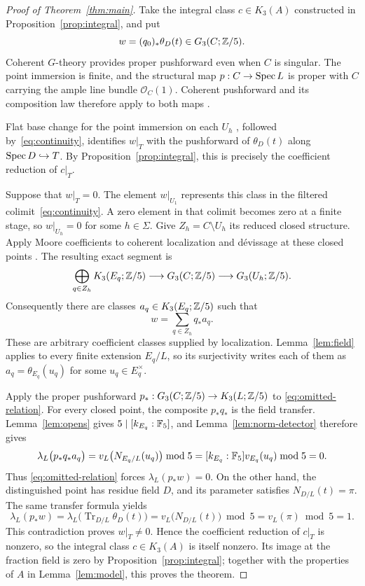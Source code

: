\begin{proof}[Proof of Theorem~\ref{thm:main}]
Take the integral class $c\in K_3(A)$ constructed in
Proposition~\ref{prop:integral}, and put
\[
 w=(q_0)_*\theta_D(t)\in G_3(C;\mathbb Z/5).
\]
Coherent $G$-theory provides proper pushforward even when $C$ is singular.
The point immersion is finite, and the structural map
$p:C\to\operatorname{Spec} L$ is proper with $C$ carrying the ample line bundle
$\mathcal O_C(1)$.  Coherent pushforward and its composition law
therefore apply to both maps
\cite[\S7, paragraph 2.7 and the discussion following (2.8)]{QuillenHigher}.

Flat base change for the point immersion on each $U_h$
\cite[V.3.7.2]{Weibel}, followed by~\eqref{eq:continuity}, identifies
$w|_T$ with the pushforward of $\theta_D(t)$ along
$\operatorname{Spec} D\hookrightarrow T$.
By Proposition~\ref{prop:integral}, this is precisely the coefficient
reduction of $c|_T$.

Suppose that $w|_T=0$.  The element $w|_{U_1}$ represents this class
in the filtered colimit~\eqref{eq:continuity}.  A zero element in
that colimit becomes zero at a finite stage, so
$w|_{U_h}=0$ for some $h\in\Sigma$.
Give $Z_h=C\setminus U_h$ its reduced closed structure.
Apply Moore coefficients to coherent localization and d\'evissage
at these closed points \cite[\S7, Proposition~3.2 and
paragraph~3.4]{QuillenHigher}. The resulting exact segment is
\[
 \bigoplus_{q\in Z_h}K_3(E_q;\mathbb Z/5)
 \longrightarrow G_3(C;\mathbb Z/5)
 \longrightarrow G_3(U_h;\mathbb Z/5).
\]
Consequently there are classes $a_q\in K_3(E_q;\mathbb Z/5)$ such that
\begin{equation}\label{eq:omitted-relation}
 w=\sum_{q\in Z_h}q_*a_q.
\end{equation}
These are arbitrary coefficient classes supplied by localization.
Lemma~\ref{lem:field} applies to every finite extension $E_q/L$,
so its surjectivity writes each of them as
$a_q=\theta_{E_q}(u_q)$ for some $u_q\in E_q^\times$.

Apply the proper pushforward
$p_*:G_3(C;\mathbb Z/5)\to K_3(L;\mathbb Z/5)$ to
\eqref{eq:omitted-relation}.
For every closed point, the composite $p_*q_*$ is the field transfer.
Lemma~\ref{lem:opens} gives $5\mid[k_{E_q}:\mathbb F_5]$, and
Lemma~\ref{lem:norm-detector} therefore gives
\[
 \lambda_L\bigl(p_*q_*a_q\bigr)
 =v_L\bigl(N_{E_q/L}(u_q)\bigr)\bmod5
 =[k_{E_q}:\mathbb F_5]v_{E_q}(u_q)\bmod5=0.
\]
Thus \eqref{eq:omitted-relation} forces $\lambda_L(p_*w)=0$.
On the other hand, the distinguished point has residue field $D$,
and its parameter satisfies $N_{D/L}(t)=\pi$.  The same transfer
formula yields
\[
 \lambda_L(p_*w)
 =\lambda_L\bigl(\operatorname{Tr}_{D/L}\theta_D(t)\bigr)
 =v_L\bigl(N_{D/L}(t)\bigr)\bmod5
 =v_L(\pi)\bmod5=1.
\]
This contradiction proves $w|_T\ne0$.
Hence the coefficient reduction of $c|_T$ is nonzero, so the
integral class $c\in K_3(A)$ is itself nonzero.
Its image at the fraction field is zero by
Proposition~\ref{prop:integral}; together with the properties of $A$
in Lemma~\ref{lem:model}, this proves the theorem.
\end{proof}
